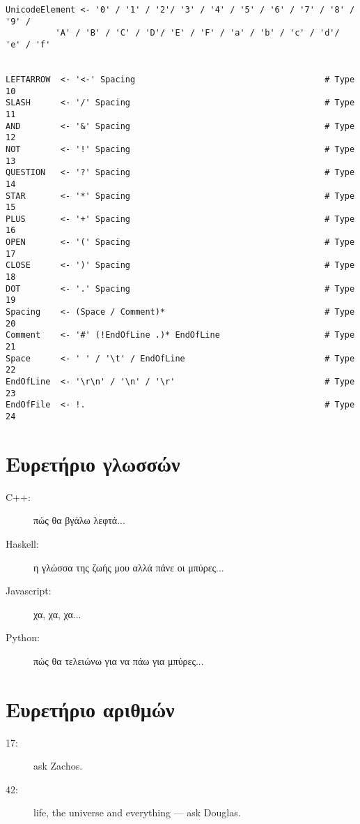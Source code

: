 \documentclass[diploma]{softlab-thesis}
\begin{document}
\begin{Verbatim}
UnicodeElement <- '0' / '1' / '2'/ '3' / '4' / '5' / '6' / '7' / '8' / '9' / 
		  'A' / 'B' / 'C' / 'D'/ 'E' / 'F' / 'a' / 'b' / 'c' / 'd'/ 'e' / 'f'


LEFTARROW  <- '<-' Spacing                                      # Type 10
SLASH      <- '/' Spacing                                       # Type 11
AND        <- '&' Spacing                                       # Type 12
NOT        <- '!' Spacing                                       # Type 13
QUESTION   <- '?' Spacing                                       # Type 14
STAR       <- '*' Spacing                                       # Type 15
PLUS       <- '+' Spacing                                       # Type 16
OPEN       <- '(' Spacing                                       # Type 17
CLOSE      <- ')' Spacing                                       # Type 18
DOT        <- '.' Spacing                                       # Type 19
Spacing    <- (Space / Comment)*                                # Type 20
Comment    <- '#' (!EndOfLine .)* EndOfLine                     # Type 21
Space      <- ' ' / '\t' / EndOfLine                            # Type 22
EndOfLine  <- '\r\n' / '\n' / '\r'                              # Type 23
EndOfFile  <- !.                                                # Type 24
\end{Verbatim}

\chapter{Ευρετήριο γλωσσών}

\begin{description}
\item[C++:] πώς θα βγάλω λεφτά...
\item[Haskell:] η γλώσσα της ζωής μου αλλά πάνε οι μπύρες...
\item[Javascript:] χα, χα, χα...
\item[Python:] πώς θα τελειώνω για να πάω για μπύρες...
\end{description}


\chapter{Ευρετήριο αριθμών}

\begin{description}
\item[17:] ask Zachos.
\item[42:] life, the universe and everything --- ask Douglas.
\end{description}


\end{document}
